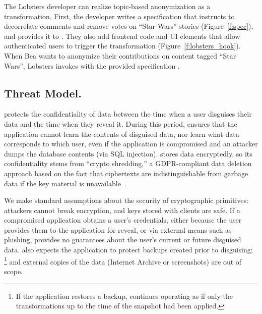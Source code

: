 %
The Lobsters developer can realize topic-based anonymization as a \xxing
transformation.
%
First, the developer writes a \xx specification that instructs \sys to
decorrelate comments and remove votes on ``Star Wars'' stories
(Figure~\ref{f:spec}), and provides it to \sys.
%
They also add frontend code and UI elements that allow authenticated users to
trigger the \xxing transformation (Figure~\ref{f:lobsters_hook}).
%
When Bea wants to anonymize their contributions on content tagged ``Star Wars'',
Lobsters invokes \sys with the provided specification .

\subsection{Threat Model.}
\label{s:threat}
%
%
%
\sys protects the confidentiality of \xxed data between the time when a user
disguises their data and the time when they reveal it.
%
%
During this period, \sys ensures that the application cannot learn the contents of
disguised data, nor learn what \xxed data corresponds to which user, even if the
application is compromised and an attacker dumps the database contents (\eg via
SQL injection).
%
\sys stores \xxed data encryptedly, so its confidentiality stems from ``crypto
shredding,'' a GDPR-compliant data deletion approach based on the fact that
ciphertexts are indistinguishable from garbage data if the key material is
unavailable~\cite{dnefs,townsend:cryptoshredding,aws:cryptoshredding,gtr:cryptoshredding}.
%

%
We make standard assumptions about the security of cryptographic primitives:
attackers cannot break encryption, and keys stored with clients are safe.
%
If a compromised application obtains a user's credentials, either because the
user provides them to the application for reveal, or via external means such as
phishing, \sys provides no guarantees about the user's current or future
disguised data.
%
\sys also expects the application to protect backups created prior to disguising;%
\footnote{If the application restores a backup, \sys continues operating
as if only the transformations up to the time of the snapshot had been applied.}
and external copies of the data
(\eg Internet Archive or screenshots) are out of scope.
%

